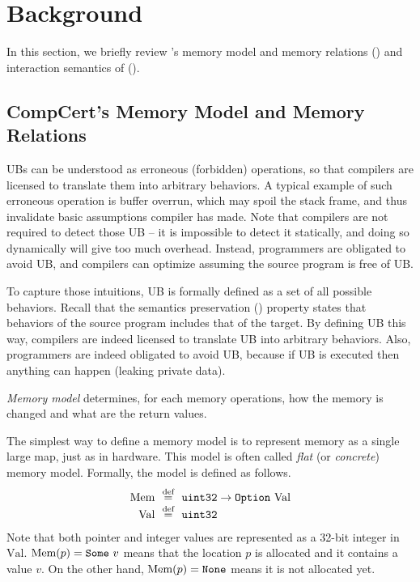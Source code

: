 \section{Background}
\label{sec:compiler:background}

In this section, we briefly review \cc{}'s memory model and memory relations () and interaction semantics of \ccc{} ().

\subsection{CompCert's Memory Model and Memory Relations}
\label{sec:compiler:background:compcert}

UBs can be understood as erroneous (forbidden) operations, so that compilers are licensed to translate them into arbitrary behaviors.
A typical example of such erroneous operation is buffer overrun, which may spoil the stack frame, and thus invalidate basic assumptions compiler has made.
Note that compilers are not required to detect those UB -- it is impossible to detect it statically, and doing so dynamically will give too much overhead.
Instead, programmers are obligated to avoid UB, and compilers can optimize assuming the source program is free of UB.

To capture those intuitions, UB is formally defined as a set of all possible behaviors.
Recall that the semantics preservation () property states that behaviors of the source program includes that of the target.
By defining UB this way, compilers are indeed licensed to translate UB into arbitrary behaviors.
Also, programmers are indeed obligated to avoid UB, because if UB is executed then anything can happen (\eg{}leaking private data).


{\it Memory model} determines, for each memory operations, how the memory is changed and what are the return values.

The simplest way to define a memory model is to represent memory as a single large map, just as in hardware.
This model is often called {\it flat} (or {\it concrete}) memory model.
Formally, the model is defined as follows.
\[
\begin{array}{r@{~~}c@{~~}l}
\textrm{Mem} & \defeq & \texttt{uint32} \rightarrow \option{\textrm{Val}} \\ %
\textrm{Val} & \defeq & \texttt{uint32}
\end{array}
\]
Note that both pointer and integer values are represented as a 32-bit integer in $\textrm{Val}$.
$\textrm{Mem}(p) = \mathtt{Some}\ {v}$ means that the location $p$ is allocated and it contains a value $v$. On the other hand, $\textrm{Mem}(p) = \texttt{None}$ means it is not allocated yet.


